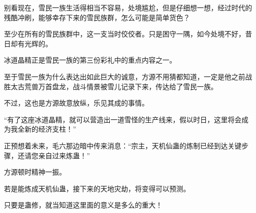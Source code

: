 \begin{this_body}
别看现在，雪民一族生活得相当不容易，处境尴尬，但是仔细想一想，经过时代的残酷冲刷，能够幸存下来的雪民族群，怎么可能是简单货色？

至少在所有的雪民族群中，这一支当时佼佼者。只是困守一隅，如今处境不好，昔日却有光辉的。

冰道晶精正是雪民一族的第三份彩礼中的重点内容之一。

至于雪民一族为什么表达出如此巨大的诚意，方源不用猜都知道，一定是他之前战胜太古荒兽万首盘龙，战斗情景被雪儿记录下来，传达给了雪民一族。

不过，这也是方源故意放纵，乐见其成的事情。

“有了这座冰道晶精，就可以营造出一道雪怪的生产线来，假以时日，这里将会成为我全新的经济支柱！”

正预想着未来，毛六那边暗中传来消息：“宗主，天机仙蛊的炼制已经到达关键步骤，还请您亲自过来炼蛊！”

方源顿时精神一振。

若是能炼成天机仙蛊，接下来的天地灾劫，将变得可以预测。

只要是蛊修，就当知道这里面的意义是多么的重大！

\end{this_body}

